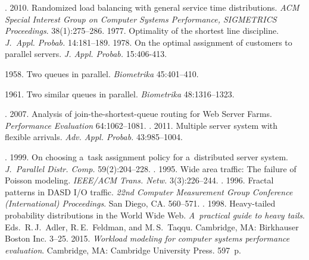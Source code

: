 \begin{multicols}{2}
{{\begin{thebibliography}{99}
    
    
    . 2010. Randomized load balancing with 
general service time distributions. \textit{ACM Special Interest Group on Computer Systems 
Performance, SIGMETRICS Proceedings}. 38(1):275--286.
     1977. Optimality of the shortest line discipline. \textit{J.~Appl. Probab.} 
14:181--189.
     1978. On the optimal assignment of customers to parallel servers. \textit{J. 
Appl. Probab.}  15:406-413.

    
     1958. Two queues in parallel. \textit{Biometrika} 45:401--410.
    
     1961. Two similar queues in parallel. \textit{Biometrika} 
48:1316--1323.

   
    . 2007. Analysis of 
    join-the-shortest-queue routing for Web Server Farms. \textit{Performance Evaluation} 
64:1062--1081.
    . 2011. Multiple server system with flexible 
arrivals. \textit{Adv. Appl. Probab.} 43:985--1004.


    
    . 1999. On choosing a~task 
assignment policy for a~distributed server system. \textit{J.~Parallel Distr. Comp.} 
59(2):204--228.
    . 1995. Wide area traffic: The failure of Poisson modeling. 
\textit{IEEE/ACM Trans. Netw.} 3(3):226--244.
    . 1996. Fractal patterns in DASD I/O traffic. 
\textit{22nd Computer  Measurement Group Conference (International) Proceedings}. 
San Diego, CA. 560--571.
    . 1998. Heavy-tailed probability 
distributions in the World Wide Web. \textit{A~practical guide to heavy tails}. Eds.\ 
R.\,J.~Adler, R.\,E.~Feldman, and M.\,S.~Taqqu. Cambridge, MA: Birkhauser Boston 
Inc. 3--25.
     2015. \textit{Workload modeling for computer systems performance 
evaluation}. Cambridge, MA: Cambridge University Press. 597~p.
    

\end{thebibliography}}}
\end{multicols}
